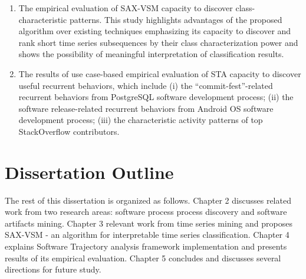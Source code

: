 \begin{enumerate}
\begin{enumerate}
 \item The empirical evaluation of SAX-VSM capacity to discover class-characteristic patterns.
This study highlights advantages of the proposed algorithm over existing techniques 
emphasizing
its capacity to discover and rank short time series subsequences by their class 
characterization power and 
shows the possibility of meaningful interpretation of classification results.
 \item The results of use case-based empirical evaluation of STA capacity to discover useful recurrent 
behaviors, which include 
(i) the ``commit-fest''-related recurrent behaviors from PostgreSQL software development process; 
(ii) the software release-related recurrent behaviors from Android OS software development process;
(iii) the characteristic activity patterns of top StackOverflow contributors.
\end{enumerate}

\end{enumerate}

\section{Dissertation Outline}\label{section_organization}
The rest of this dissertation is organized as follows. 
Chapter 2 discusses related work from two research areas: software process process discovery and software artifacts mining. 
Chapter 3 relevant work from time series mining and proposes SAX-VSM - an algorithm for interpretable time series 
classification. 
Chapter 4 explains Software Trajectory analysis framework implementation and presents results of its empirical evaluation. 
Chapter 5 concludes and discusses several directions for future study.